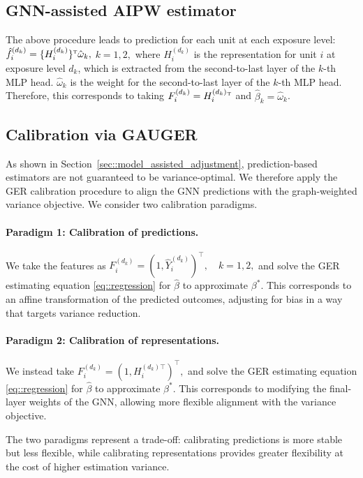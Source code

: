 \documentclass[twoside]{article}
\theoremstyle{plain}
\theoremstyle{definition}
\theoremstyle{remark}
\def\T{{\textsc{t}}}
\begin{document}
\subsection{GNN-assisted AIPW estimator}
The above procedure leads to prediction for each unit at each exposure level: $\hat{f}_i^{(d_k)} = \{H_i^{(d_k)}\}{}^\T \hat{\omega}_k,$ $k=1,2,$
where $H_i^{(d_k)}$ is the representation for unit $i$ at exposure level $d_k$, which is extracted from the second-to-last layer of the $k$-th MLP head. $\hat{\omega}_k$ is the weight for the second-to-last layer of the $k$-th MLP head. Therefore, this corresponds to taking $F_i^{(d_k)} = H_i^{(d_k)}{}^\T$ and $\hat\beta_k = \hat{\omega}_k$.

\subsection{Calibration via GAUGER}

As shown in Section~\ref{sec::model_assisted_adjustment}, prediction-based estimators are not guaranteed to be variance-optimal. We therefore apply the GER calibration procedure to align the GNN predictions with the graph-weighted variance objective. We consider two calibration paradigms.

\paragraph{Paradigm 1: Calibration of predictions.}
We take the features as
$
F_i^{(d_k)} = (1, \hat{Y}_i^{(d_k)})^\top, \quad k=1,2,$
and solve the GER estimating equation \eqref{eq::regression} for $\hat\beta$ to approximate $\beta^*$. This corresponds to an affine transformation of the predicted outcomes, adjusting for bias in a way that targets variance reduction.

\paragraph{Paradigm 2: Calibration of representations.}
We instead take
$
F_i^{(d_k)} = (1, H_i^{(d_k)\top})^\top,$
and solve the GER estimating equation \eqref{eq::regression} for $\hat\beta$ to approximate $\beta^*$. This corresponds to modifying the final-layer weights of the GNN, allowing more flexible alignment with the variance objective.

The two paradigms represent a trade-off: calibrating predictions is more stable but less flexible, while calibrating representations provides greater flexibility at the cost of higher estimation variance.
\end{document}
